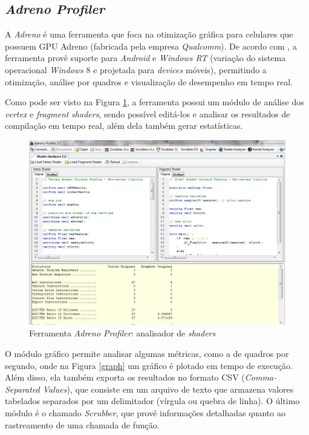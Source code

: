 \subsection{\textit{Adreno Profiler}}

	A \textit{Adreno} é uma ferramenta que foca na otimização gráfica para celulares que possuem GPU Adreno (fabricada pela empresa \textit{Qualcomm}). De acordo com  \cite{adp}, a ferramenta provê suporte para \textit{Android} e \textit{Windows RT} (variação do sistema operacional \textit{Windows} 8  e projetada para \textit{devices} móveis), permitindo a otimização, análise por quadros e visualização de desempenho em tempo real. 

	Como pode ser visto na Figura \ref{adrenoProfiler}, a ferramenta possui um módulo de análise dos \textit{vertex} e \textit{fragment} \textit{shaders}, sendo possível editá-los e analisar os resultados de compilação em tempo real, além dela também gerar estatísticas.  

	\begin{figure}[h]
	\centering
		\includegraphics[keepaspectratio=true,scale=0.4]{figuras/shader_analyzer.jpg}
	\caption{Ferramenta \textit{Adreno Profiler}: analisador de \textit{shaders}}
	\label{adrenoProfiler}
	\end{figure}

	O módulo gráfico permite analisar algumas métricas, como a de quadros por segundo, onde na Figura \ref{graph} um gráfico é plotado em tempo de execução. Além disso, ela também exporta os resultados no formato CSV (\textit{Comma-Separated Values}), que consiste em um arquivo de texto que armazena valores tabelados separados por um delimitador (vírgula ou quebra de linha). O último módulo é o chamado \textit{Scrubber}, que provê informações detalhadas quanto ao rastreamento de uma chamada de função. 

